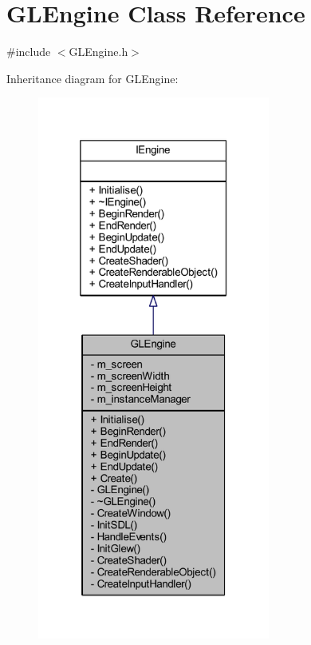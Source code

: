 \hypertarget{class_g_l_engine}{}\section{G\+L\+Engine Class Reference}
\label{class_g_l_engine}


{\ttfamily \#include $<$G\+L\+Engine.\+h$>$}



Inheritance diagram for G\+L\+Engine\+:\nopagebreak
\begin{figure}[H]
\begin{center}
\leavevmode
\includegraphics[width=217pt]{class_g_l_engine__inherit__graph}
\end{center}
\end{figure}


